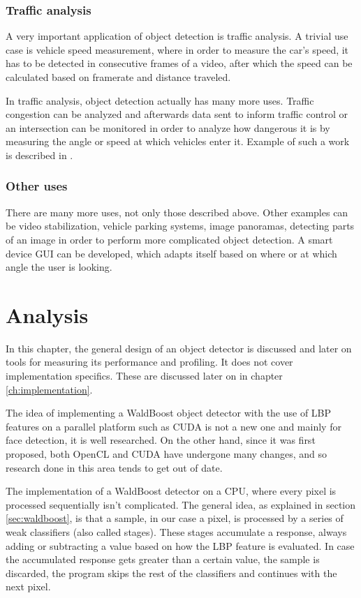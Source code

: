 \subsection{Traffic analysis}\label{subsec:uc-traffic-analysis}

A very important application of object detection is traffic analysis. A trivial use case is vehicle speed measurement, where in order to measure the car's speed, it has to be detected in consecutive frames of a video, after which the speed can be calculated based on framerate and distance traveled.

In traffic analysis, object detection actually has many more uses. Traffic congestion can be analyzed and afterwards data sent to inform traffic control or an intersection can be monitored in order to analyze how dangerous it is by measuring the angle or speed at which vehicles enter it. Example of such a work is described in \cite{sochor2014}.

\subsection{Other uses}

There are many more uses, not only those described above. Other examples can be video stabilization, vehicle parking systems, image panoramas, detecting parts of an image in order to perform more complicated object detection. A smart device GUI can be developed, which adapts itself based on where or at which angle the user is looking.

\chapter{Analysis}\label{ch:analysis}

In this chapter, the general design of an object detector is discussed and later on tools for measuring its performance and profiling. It does not cover implementation specifics. These are discussed later on in chapter \ref{ch:implementation}.

The idea of implementing a WaldBoost object detector with the use of LBP features on a parallel platform such as CUDA is not a new one and mainly for face detection, it is well researched. On the other hand, since it was first proposed, both OpenCL and CUDA have undergone many changes, and so research done in this area tends to get out of date.

The implementation of a WaldBoost detector on a CPU, where every pixel is processed sequentially isn't complicated. The general idea, as explained in section \ref{sec:waldboost}, is that a sample, in our case a pixel, is processed by a series of weak classifiers (also called stages). These stages accumulate a response, always adding or subtracting a value based on how the LBP feature is evaluated. In case the accumulated response gets greater than a certain value, the sample is discarded, the program skips the rest of the classifiers and continues with the next pixel.


